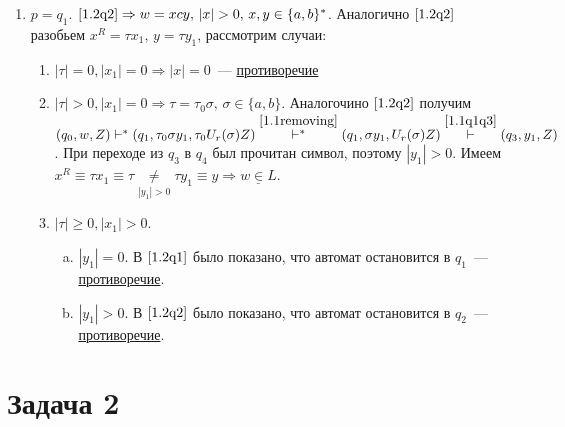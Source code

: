 \documentclass[a4paper]{article}
\begin{document}
\begin{enumerate}[1.]
\begin{enumerate}
\begin{enumerate}
\item $p=q_1$. $\ref{1.2q2}\Rightarrow w=xcy,\,|x|>0,\,x,y\in\{a,b\}^*$. Аналогично $\ref{1.2q2}$ разобьем $x^R=\tau x_1,\,y=\tau y_1$, рассмотрим случаи:\begin{enumerate}
\item $|\tau|=0,|x_1|=0\Rightarrow|x|=0$~--- \underline{противоречие}
\item $|\tau|>0,|x_1|=0\Rightarrow\tau=\tau_0\sigma,\,\sigma\in\{a,b\}$. Аналогочино $\ref{1.2q2}$ получим $(q_0,w,Z)\vdash^*(q_1,\tau_0\sigma y_1,\tau_0 U_r(\sigma)Z)\overset{\ref{1.1removing}}{\vdash^*}(q_1,\sigma y_1,U_r(\sigma)Z)\overset{\ref{1.1q1q3}}{\vdash}(q_3,y_1,Z)$. При переходе из $q_3$ в $q_4$ был прочитан символ, поэтому $|y_1|>0$. Имеем $x^R\equiv\tau x_1\equiv\tau\underset{|y_1|>0}{\neq}\tau y_1\equiv y\Rightarrow\underline{w\in L}$.
\item $|\tau|\geqslant 0,|x_1|>0$.\begin{enumerate}[a.]
\item $|y_1|=0$. В $\ref{1.2q1}$ было показано, что автомат остановится в $q_1$~--- \underline{противоречие}.
\item $|y_1|>0$. В $\ref{1.2q2}$ было показано, что автомат остановится в $q_2$~--- \underline{противоречие}.
\end{enumerate}
\end{enumerate}
\end{enumerate}
\end{enumerate}
\end{enumerate}
\newpage
\section*{Задача 2}
\end{document}
